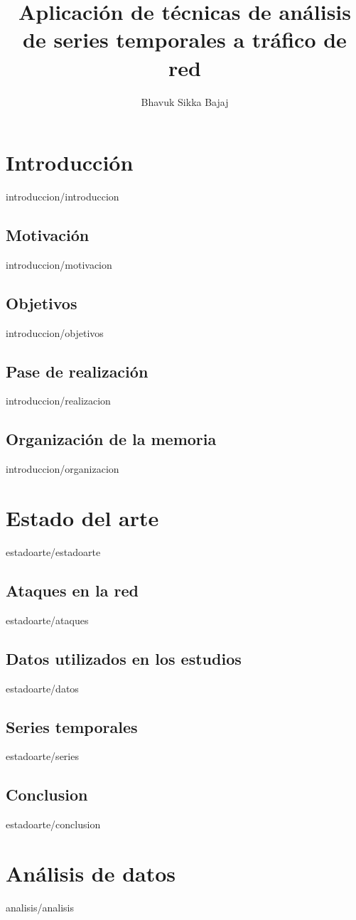 \documentclass[epsbased,copyright,final,printable,covers,extendedindex,firstnumbered,tfg,gnuplot]{tfgtfmthesisuam}
\title{Aplicación de técnicas de análisis de series temporales a tráfico de red}
\author{Bhavuk Sikka Bajaj}
\begin{document}
\chapter{Introducción\label{CAP:INTRODUCCION}}{introduccion/introduccion}
  \section{Motivación\label{SEC:MOTIVACION}}{introduccion/motivacion}
  \section{Objetivos\label{SEC:OBJETIVOS}}{introduccion/objetivos}
  \section{Pase de realización\label{SEC:REALIZACION}}{introduccion/realizacion}
  \section{Organización de la memoria\label{SEC:ORGANIZACION}}{introduccion/organizacion}

\chapter{Estado del arte\label{CAP:ESTADOARTE}}{estadoarte/estadoarte}
  \section{Ataques en la red\label{SEC:ATAQUES}}{estadoarte/ataques}
  \section{Datos utilizados en los estudios\label{SEC:DATOS}}{estadoarte/datos}
  \section{Series temporales\label{SEC:SERIESTEMPORALES}}{estadoarte/series}
  \section{Conclusion\label{SEC:EACONCLUSION}}{estadoarte/conclusion}

\chapter{Análisis de datos\label{CAP:ANALISIS}}{analisis/analisis}
\end{document}
